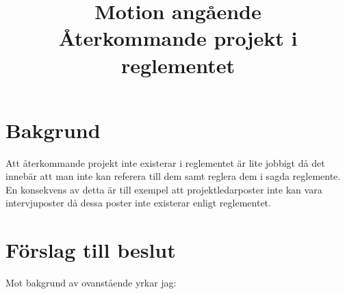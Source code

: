 \documentclass[a4paper]{article}
\title{\textcolor{cerise}{\textbf{
    Motion angående\\
    Återkommande projekt i reglementet
}}}
\date{}
\begin{document}
\maketitle
\thispagestyle{fancy} %

\section*{\textcolor{cerise}{
    Bakgrund
}}

Att återkommande projekt inte existerar i reglementet är lite jobbigt då det innebär att man
inte kan referera till dem samt reglera dem i sagda reglemente. En konsekvens av detta är till
exempel att projektledarposter inte kan vara intervjuposter då dessa poster inte existerar enligt
reglementet.

\section*{\textcolor{cerise}{
    Förslag till beslut
}}

	Mot bakgrund av ovanstående yrkar jag:
\end{document}
